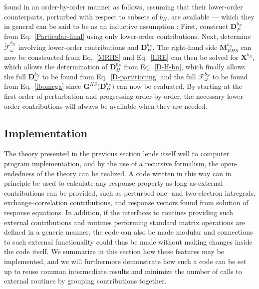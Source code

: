 \documentclass[%
 reprint,
 amsmath,amssymb,
 aps,
]{revtex4-1}
\begin{document}
found in an order-by-order manner as follows, assuming that their lower-order
counterparts, perturbed with respect to subsets of $b_{N}$, are available ---
which they in general can be said to be as an inductive assumption
: First, construct $\mathbf{D}^{b_N}_{P}$ from
Eq.~\eqref{Particular-final} using only lower-order contributions. Next,
determine $\breve{\bm{\mathcal{F}}}^{b_{N}}_{\omega}$ involving lower-order
contributions and $\mathbf{D}^{b_N}_{P}$. The right-hand side
$\mathbf{M}_{RHS}^{b_N}$ can now be constructed from Eq.~\eqref{MRHS}
 and
Eq.~\eqref{LRE} can then be solved for $\mathbf{X}^{b_N}$, which allows the
determination of $\mathbf{D}_{H}^{b_N}$ from Eq.~\eqref{D-H-bn}, which finally
allows the full $\mathbf{D}^{b_N}_{\omega}$ to be found from
Eq.~\eqref{D-partitioning} and the full $\bm{\mathcal{F}}^{b_{N}}_{\omega}$ to
be found from Eq.~\eqref{fbomega} since $\mathbf{G}^{KS} \bigl(
\mathbf{D}_{H}^{b_{N}} \bigr)$ can now be evaluated. By starting at the first
order of perturbation and progressing order-by-order, the necessary lower-order
contributions will always be available when they are
needed.


\subsection{Implementation}
\label{routines}

The theory presented in the previous section lends itself well to computer
program implementation, and by the use of a recursive formalism, the
open-endedness of the theory can be realized. A code written in this way can in
principle be used to calculate any response property as long as external
contributions can be provided, such as perturbed one- and two-electron
intregrals, exchange--correlation contributions, and response vectors found
from solution of response equations. In addition, if the interfaces to routines
providing such external contributions and routines performing standard matrix
operations are defined in a generic manner, the code can also be made modular
and connections to such external functionality could thus be made without
making changes inside the code itself. We summarize in this section how these
features may be implemented, and we will furthermore demonstrate how such a
code can be set up to reuse common intermediate results and minimize the number
of calls to external routines by grouping contributions together.
\end{document}
